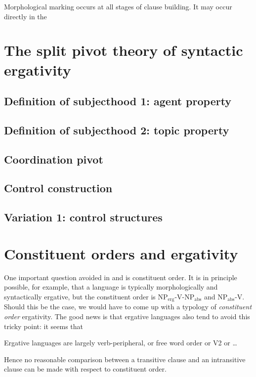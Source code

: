 \documentclass{article}
\begin{document}


Morphological marking occurs at all stages of clause building.
It may occur directly in the 

\section{The split pivot theory of syntactic ergativity}\label{sec:split-pivot}

\subsection{Definition of subjecthood 1: agent property}

\subsection{Definition of subjecthood 2: topic property}

\subsection{Coordination pivot}

\subsection{Control construction}

\subsection{Variation 1: control structures}

\section{Constituent orders and ergativity}

One important question avoided in  and 
is constituent order.
It is in principle possible, for example, 
that a language is typically morphologically and syntactically ergative,
but the constituent order is NP$_{\text{erg}}$-V-NP$_{\text{abs}}$ and NP$_{\text{abs}}$-V.
Should this be the case, 
we would have to come up with a typology of \emph{constituent order} ergativity.
The good news is that ergative languages also tend to avoid this tricky point: 
it seems that \citep{mahajan1994ergativity}
\begin{exe}
    \ex Ergative languages are largely verb-peripheral, or free word order or V2 or \dots
\end{exe}
Hence no reasonable comparison between a transitive clause and an intransitive clause can be made 
with respect to constituent order.
\end{document}
